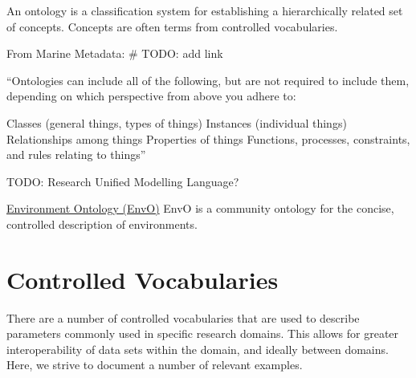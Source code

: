 \documentclass[
]{book}
\begin{document}
An ontology is a classification system for establishing a hierarchically related set of concepts. Concepts are often terms from controlled vocabularies.

From Marine Metadata: \# TODO: add link

``Ontologies can include all of the following, but are not required to include them, depending on which perspective from above you adhere to:

Classes (general things, types of things)
Instances (individual things)
Relationships among things
Properties of things
Functions, processes, constraints, and rules relating to things''

TODO: Research Unified Modelling Language?

\href{http://www.obofoundry.org/ontology/envo.html}{Environment Ontology (EnvO)} EnvO is a community ontology for the concise, controlled description of environments.

\hypertarget{controlled-vocabularies}{%
\section{Controlled Vocabularies}\label{controlled-vocabularies}}

There are a number of controlled vocabularies that are used to describe parameters commonly used in specific research domains. This allows for greater interoperability of data sets within the domain, and ideally between domains. Here, we strive to document a number of relevant examples.
\end{document}
